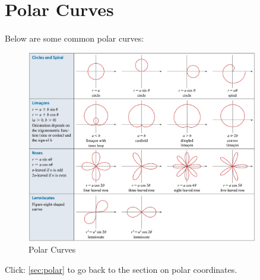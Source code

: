 \section{Polar Curves}\label{app:polarCurves}
\paragraph{} Below are some common polar curves:
\begin{figure}[h!]
    \centering
    \includegraphics[width=0.9\textwidth]{AppendixItems/polarCurves.png}
    \caption{Polar Curves}
    \label{fig:polarCurves}
\end{figure}
Click: \ref{sec:polar} to go back to the section on polar coordinates.